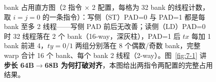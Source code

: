 \begin{figure}[htbp]
\caption{bank 占用直方图（2 指令 $\times$ 2 配置，每格为 32 bank 的线程计数，取 $i=j=0$ 的一条指令）：写侧（ST）PAD=0 与 PAD=1 都是每 bank 至多 2 线程——写侧 PAD 前后无改善；读侧（LD）PAD=0 时 32 线程落在 2 个 bank（16-way，深灰柱），PAD=1 后 $tx$ 每加 1 bank 前进 4，$ty=0/1$ 两组分别落在 8 个偶数/奇数 bank，完整 warp 合计 16 个 bank、每个 bank 2 线程（2-way）。图~\ref{fig:7-1} 讲\textbf{步长 64B$\to$68B 为何打破对齐}，本图给出两指令两配置的完整占用结果。}
\label{fig:7-5}
\end{figure}

